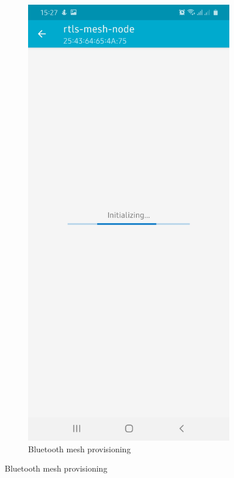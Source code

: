 \documentclass[\main/main.tex]{subfiles}
\begin{document}
\begin{figure}[H]
    \centering
    \begin{subfigure}[b]{0.4\linewidth}
        \centering
        \includegraphics[width=0.9\linewidth]{nRF_Mesh_02.jpg}
        \caption{Bluetooth mesh provisioning}
    \end{subfigure}

\end{figure}
\end{document}
